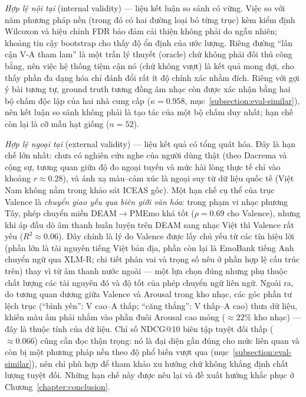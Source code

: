 \documentclass[../DoAn.tex]{subfiles}
\begin{document}
\textit{Hợp lệ nội tại} (internal validity) --- liệu kết luận so sánh có vững. Việc so với năm phương pháp nền (trong đó có hai đường loại bỏ từng trục) kèm kiểm định Wilcoxon và hiệu chỉnh FDR bảo đảm cải thiện không phải do ngẫu nhiên; khoảng tin cậy bootstrap cho thấy độ ổn định của ước lượng. Riêng đường ``lân cận V-A tham lam'' là một trần lý thuyết (oracle) chứ không phải đối thủ công bằng, nên việc hệ thống tiệm cận nó (chứ không vượt) là kết quả mong đợi, cho thấy phần đa dạng hóa chỉ đánh đổi rất ít độ chính xác nhắm đích. Riêng với gợi ý bài tương tự, ground truth tương đồng âm nhạc còn được xác nhận bằng hai bộ chấm độc lập của hai nhà cung cấp ($\kappa = 0.958$, mục~\ref{subsection:eval-similar}), nên kết luận so sánh không phải là tạo tác của một bộ chấm duy nhất; hạn chế còn lại là cỡ mẫu hạt giống ($n = 52$).

\textit{Hợp lệ ngoại tại} (external validity) --- liệu kết quả có tổng quát hóa. Đây là hạn chế lớn nhất: chưa có nghiên cứu nghe của người dùng thật (theo Dacrema và cộng sự, tương quan giữa độ đo ngoại tuyến và mức hài lòng thực tế chỉ vào khoảng $r \approx 0.28$), và ánh xạ màu--cảm xúc là ngoại suy từ dữ liệu quốc tế (Việt Nam không nằm trong khảo sát ICEAS gốc). Một hạn chế cụ thể của trục Valence là \textit{chuyển giao yếu qua biên giới văn hóa}: trong phạm vi nhạc phương Tây, phép chuyển miền DEAM$\to$PMEmo khá tốt ($\rho = 0.69$ cho Valence), nhưng khi áp đầu dò âm thanh huấn luyện trên DEAM sang nhạc Việt thì Valence rất yếu ($R^2 \approx 0.06$). Đây chính là lý do Valence được lấy chủ yếu từ các tín hiệu lời (phần lớn là tài nguyên tiếng Việt bản địa, phần còn lại là EmoBank tiếng Anh chuyển ngữ qua XLM-R; chi tiết phân vai và trọng số nêu ở phần hợp lệ cấu trúc trên) thay vì từ âm thanh nước ngoài --- một lựa chọn đúng nhưng phụ thuộc chất lượng các tài nguyên đó và độ tốt của phép chuyển ngữ liên ngữ. Ngoài ra, do tương quan dương giữa Valence và Arousal trong kho nhạc, các góc phần tư lệch trục (``bình yên'': V cao--A thấp; ``căng thẳng'': V thấp--A cao) thưa dữ liệu, khiến màu ấm phải nhắm vào phần đuôi Arousal cao mỏng ($\approx 22\%$ kho nhạc) --- đây là thuộc tính của dữ liệu. Chỉ số NDCG@10 biên tập tuyệt đối thấp ($\approx 0.066$) cũng cần đọc thận trọng: nó là đại diện gần đúng cho mức liên quan và còn bị một phương pháp nền theo độ phổ biến vượt qua (mục~\ref{subsection:eval-similar}), nên chỉ phù hợp để tham khảo xu hướng chứ không khẳng định chất lượng tuyệt đối. Những hạn chế này được nêu lại và đề xuất hướng khắc phục ở Chương~\ref{chapter:conclusion}.
\end{document}
